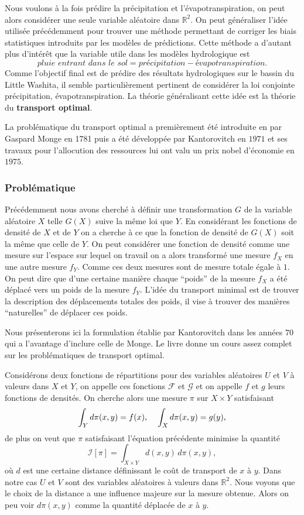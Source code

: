 \documentclass[a4paper,10pt]{article}
\begin{document}
	Nous voulons à la fois prédire la précipitation et l'évapotranspiration, on peut alors considérer une seule variable aléatoire dans $\mathbb{R}^2$. On peut généraliser l'idée utilisée précédemment pour trouver une méthode permettant de corriger les biais statistiques introduits par les modèles de prédictions. Cette méthode a d'autant plus d'intérêt que la variable utile dans les modèles hydrologique est 
	\[\textit{pluie entrant dans le sol}=\textit{précipitation}-\textit{évapotranspiration}.\]
	Comme l'objectif final est de prédire des résultats hydrologiques sur le bassin du Little Washita, il semble particulièrement pertinent de considérer la loi conjointe précipitation, évapotranspiration. La théorie généralisant cette idée est la théorie du \textbf{transport optimal}.
	
	La problématique du transport optimal a premièrement été introduite en par Gaspard Monge en 1781 puis a été développée par Kantorovitch en $1971$ et ses travaux pour l'allocution des ressources lui ont valu un prix nobel d'économie en $1975$.
	
	\subsubsection{Problématique}
	
	Précédemment nous avons cherché à définir une transformation $G$ de la variable aléatoire $X$ telle $G(X)$ suive la même loi que $Y$. En considérant les fonctions de densité de $X$ et de $Y$ on a cherche à ce que la fonction de densité de $G(X)$ soit la même que celle de $Y$. On peut considérer une fonction de densité comme une mesure sur l'espace sur lequel on travail on a alors transformé une mesure $f_X$ en une autre mesure $f_Y$. Comme ces deux mesures sont de mesure totale égale à $1$. On peut dire que d'une certaine manière chaque ``poids'' de la mesure $f_X$ a été déplacé vers un poids de la mesure $f_Y$. L'idée du transport minimal est de trouver la description des déplacements totales des poids, il vise à trouver des manières ``naturelles'' de déplacer ces poids.  
	
	Nous présenterons ici la formulation établie par Kantorovitch dans les années $70$ qui a l'avantage d'inclure celle de Monge. Le livre \cite{villani2003topics} donne un cours assez complet sur les problématiques de transport optimal. 
	
	Considérons deux fonctions de répartitions pour des variables aléatoires $U$ et $V$ à valeurs dans $X$ et $Y$, on appelle ces fonctions $\mathcal{F}$ et $\mathcal{G}$ et on appelle $f$ et $g$ leurs fonctions de densités. On cherche alors une mesure $\pi$ sur  $X \times Y$ satisfaisant
	\[\int_{Y} d\pi(x,y)= f(x), \hspace{4mm} \int_{X}  d \pi(x,y)= g(y),\]
	de plus on veut que $\pi$ satisfaisant l'équation précédente minimise la quantité
	\[\mathcal{I}[\pi]=\int_{X \times Y}d(x,y) \, d\pi(x,y),\]
	où $d$ est une certaine distance définissant le coût de transport de $x$ à $y$. Dans notre cas $U$ et $V$ sont des variables aléatoires à valeurs dans $\mathbb{R}^2$. Nous voyons que le choix de la distance a une influence majeure sur la mesure obtenue. Alors on peu voir $d\pi(x,y)$ comme la quantité déplacée de $x$ à $y$.
\end{document}
